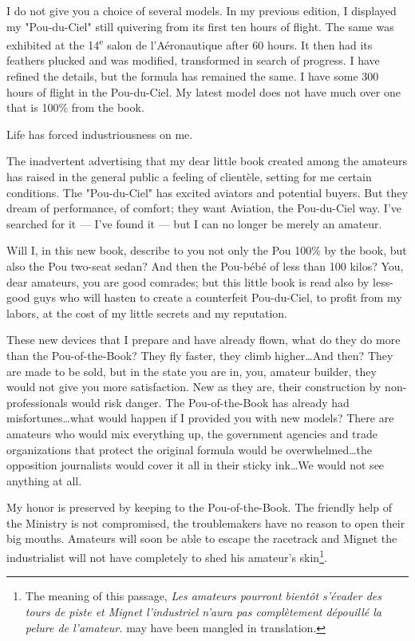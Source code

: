 \documentclass{book}
\begin{document}
I do not give you a choice of several models. In my previous edition,
I displayed my "Pou-du-Ciel" still quivering from its first ten hours
of flight. The same was exhibited at the 14\textsuperscript{e} salon
de l'Aéronautique after 60 hours. It then had its feathers plucked and
was modified, transformed in search of progress. I have refined the
details, but the formula has remained the same. I have some 300 hours
of flight in the Pou-du-Ciel. My latest model does not have much over
one that is 100\% from the book.

Life has forced industriousness on me.

The inadvertent advertising that my dear little book created among the
amateurs has raised in the general public a feeling of client\`ele,
setting for me certain conditions. The "Pou-du-Ciel" has excited
aviators and potential buyers. But they dream of performance, of
comfort; they want Aviation, the Pou-du-Ciel way. I've searched for it
--- I've found it --- but I can no longer be merely an amateur.

Will I, in this new book, describe to you not only the Pou 100\% by
the book, but also the Pou two-seat sedan? And then the Pou-bébé of
less than 100 kilos? You, dear amateurs, you are good comrades; but
this little book is read also by less-good guys who will hasten to
create a counterfeit Pou-du-Ciel, to profit from my labors, at the
cost of my little secrets and my reputation.

These new devices that I prepare and have already flown, what do they
do more than the Pou-of-the-Book? They fly faster, they climb
higher\ldots And then? They are made to be sold, but in the state you
are in, you, amateur builder, they would not give you more
satisfaction. New as they are, their construction by non-professionals
would risk danger. The Pou-of-the-Book has already had
misfortunes\ldots what would happen if I provided you with new models?
There are amateurs who would mix everything up, the government
agencies and trade organizations that protect the original formula
would be overwhelmed\ldots the opposition journalists would cover it
all in their sticky ink\ldots We would not see anything at all.

My honor is preserved by keeping to the Pou-of-the-Book. The friendly
help of the Ministry is not compromised, the troublemakers have no
reason to open their big mouths. Amateurs will soon be able to escape
the racetrack and Mignet the industrialist will not have completely to
shed his amateur's skin\footnote{The meaning of this passage,
  \textit{\guillemotleft Les amateurs pourront bient\^ot s'\'evader
    des tours de piste et Mignet l'industriel n'aura pas
    compl\`etement d\'epouill\'e la pelure de
    l'amateur.\guillemotright} may have been mangled in translation.}.
\end{document}
